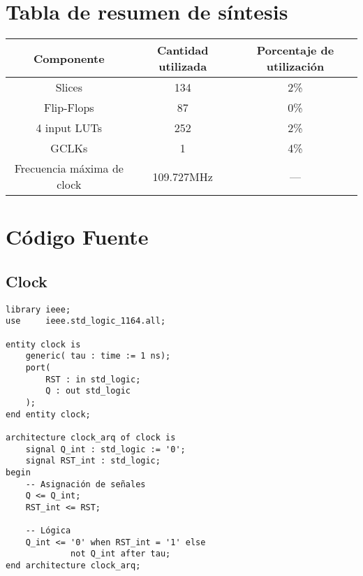 \documentclass[10pt,a4paper]{article}
\author{Diego Almirón, 94051, diego90dionisio@gmail.com}
\begin{document}
\section*{Tabla de resumen de síntesis}
\begin{table}[h]
\begin{tabular}{|c|c|c|}
\hline 
Componente & Cantidad utilizada & Porcentaje de utilización \\ 
\hline 
Slices & 134 & 2\% \\ 
\hline 
Flip-Flops & 87 & 0\% \\ 
\hline 
4 input LUTs & 252 & 2\% \\ 
\hline 
GCLKs & 1 & 4\% \\ 
\hline 
Frecuencia máxima de clock & 109.727MHz & --- \\ 
\hline 
\end{tabular} 
\end{table}

\newpage
\section*{Código Fuente}
\subsection*{Clock}
\begin{center}
\begin{verbatim}
library ieee;
use     ieee.std_logic_1164.all;

entity clock is
    generic( tau : time := 1 ns);
    port(
        RST : in std_logic;
        Q : out std_logic
    );
end entity clock;

architecture clock_arq of clock is
    signal Q_int : std_logic := '0';
    signal RST_int : std_logic;
begin
    -- Asignación de señales
    Q <= Q_int;
    RST_int <= RST;

    -- Lógica
    Q_int <= '0' when RST_int = '1' else
             not Q_int after tau; 
end architecture clock_arq;
\end{verbatim}
\end{center}
\end{document}
